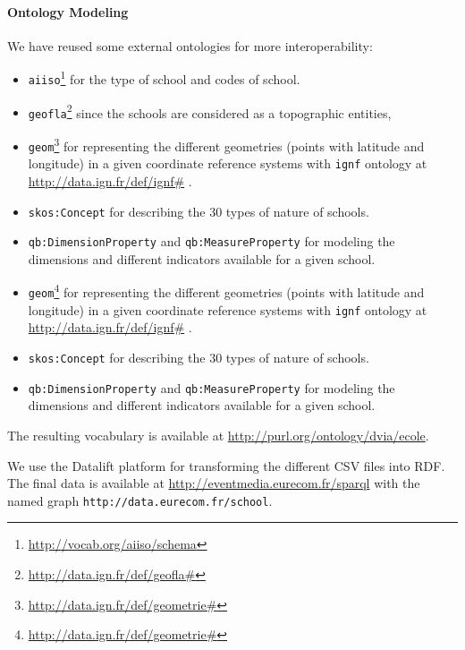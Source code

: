 \paragraph{Ontology Modeling}
We have reused some external ontologies for more interoperability:
\begin{itemize}
\item \texttt{aiiso}\footnote{\url{http://vocab.org/aiiso/schema}} for the type of school and codes of school.
\item \texttt{geofla}\footnote{\url{http://data.ign.fr/def/geofla\#}} since the schools are considered as a topographic entities,

\item \texttt{geom}\footnote{\url{http://data.ign.fr/def/geometrie\#}} for representing the different geometries (points with latitude and longitude) in a given coordinate reference systems with \texttt{ignf} ontology at \url{http://data.ign.fr/def/ignf\#} . 
\item \texttt{skos:Concept} for describing the 30 types of nature of schools. 
\item \texttt{qb:DimensionProperty} and \texttt{qb:MeasureProperty} \cite{dcube} for modeling the dimensions and different indicators available for a given school. 

\item \texttt{geom}\footnote{\url{http://data.ign.fr/def/geometrie\#}} for representing the different geometries (points with latitude and longitude) in a given coordinate reference systems with \texttt{ignf} ontology at \url{http://data.ign.fr/def/ignf\#} .
\item \texttt{skos:Concept} for describing the 30 types of nature of schools.
\item \texttt{qb:DimensionProperty} and \texttt{qb:MeasureProperty} \cite{dcube} for modeling the dimensions and different indicators available for a given school.

\end{itemize}
The resulting vocabulary is available at \url{http://purl.org/ontology/dvia/ecole}.

We use the Datalift platform for transforming the different CSV files into RDF. The final data is available  at \url{http://eventmedia.eurecom.fr/sparql} with the named graph \texttt{http://data.eurecom.fr/school}.


